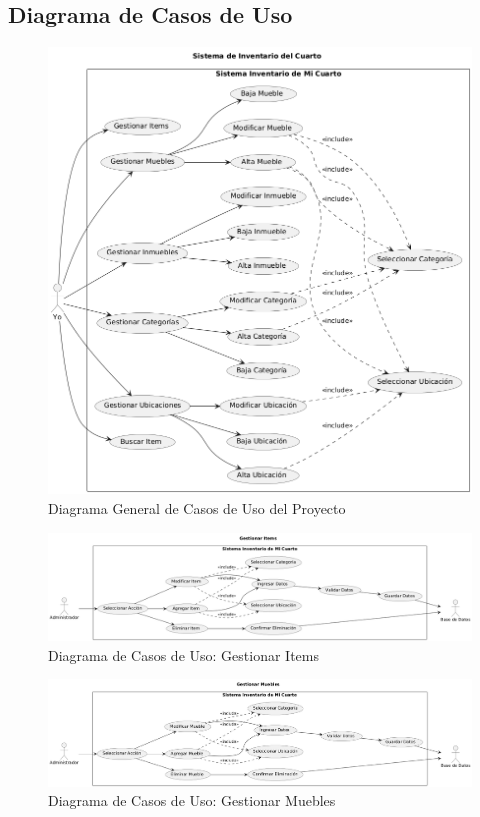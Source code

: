 \documentclass{article}
\begin{document}
\subsection{Diagrama de Casos de Uso}
\begin{figure}[H]
    \center
    \includegraphics[width=\textwidth]{img/image.png}
    \caption{Diagrama General de Casos de Uso del Proyecto}
\end{figure}

\begin{figure}[H]
    \centering
    \includegraphics[width=\textwidth]{img/GestionarItems.png}
    \caption{Diagrama de Casos de Uso: Gestionar Items}
\end{figure}

\begin{figure}[H]
    \centering
    \includegraphics[width=\textwidth]{img/GestionarMuebles.png}
    \caption{Diagrama de Casos de Uso: Gestionar Muebles}
\end{figure}
\end{document}
